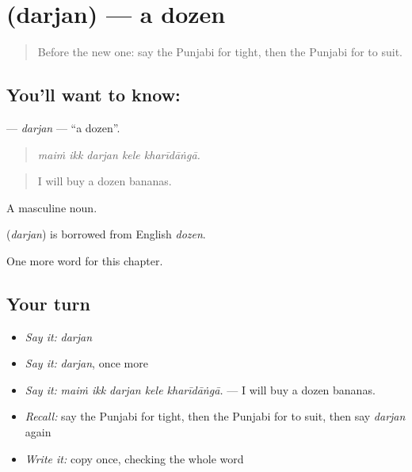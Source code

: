 \section[\texorpdfstring{\pa{ਦਰਜਨ} (darjan)}{ਦਰਜਨ (darjan)}]{ (darjan) — a dozen}

\label{lesson:PA-C275-darjan}



\begin{quote}
Before the new one: say the Punjabi for tight, then the Punjabi for to suit.
\end{quote}

\subsection*{You'll want to know: }
\textbf{} — \emph{darjan} — \textquotedblleft{}a dozen\textquotedblright{}.

\begin{quote}
    
\end{quote}

\begin{quote}
\emph{maiṁ ikk darjan kele kharīdāṅgā.}
\end{quote}

\begin{quote}
I will buy a dozen bananas.
\end{quote}

A masculine noun.

\begin{cousinweb}
\textbf{} (\emph{darjan}) is borrowed from English \emph{dozen}.
\end{cousinweb}

\begin{grammarlens}[title={What you've built}]
One more word for this chapter.
\end{grammarlens}

\subsection*{Your turn}
\begin{itemize}
\raggedright
  \item \emph{Say it:} \emph{darjan}
  \item \emph{Say it:} \emph{darjan}, once more
  \item \emph{Say it:} \emph{maiṁ ikk darjan kele kharīdāṅgā.} — I will buy a dozen bananas.
  \item \emph{Recall:} say the Punjabi for tight, then the Punjabi for to suit, then say \emph{darjan} again
  \item \emph{Write it:} copy \textbf{} once, checking the whole word
\end{itemize}

